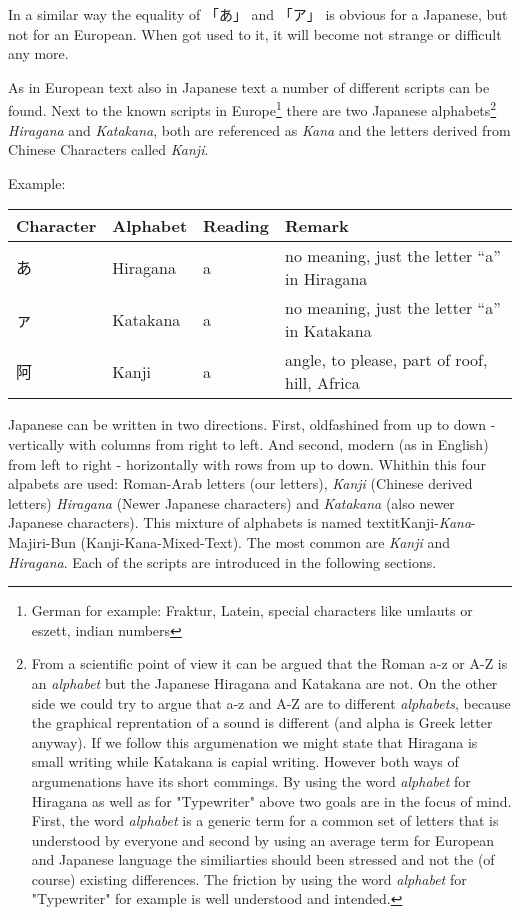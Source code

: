 In a similar way the equality of {「あ」} and {「ア」} is obvious for a
Japanese, but not for an European. When got used to it, it will become not
strange or difficult any more.

As in European text also in Japanese text a number of different scripts can be
found. Next to the known scripts in Europe\footnote{German for example:
Fraktur, Latein, special characters like umlauts or eszett, indian numbers}
there are two Japanese alphabets\footnote{ From a scientific point of view it
can be argued that the Roman a-z or A-Z is an \textit{alphabet} but the
Japanese Hiragana and Katakana are not. On the other side we could try to argue
that a-z and A-Z are to different \textit{alphabets}, because the graphical
reprentation of a sound is different (and alpha is Greek letter anyway). If we
follow this argumenation we might state that Hiragana is small writing while
Katakana is capial writing. However both ways of argumenations have its short
commings. By using the word \textit{alphabet} for Hiragana as well as for
"Typewriter" above two goals are in the focus of mind. First, the word
\textit{alphabet} is a generic term for a common set of letters that is
understood by everyone and second by using an average term for European and
Japanese language the similiarties should been stressed and not the (of course)
existing differences. The friction by using the word \textit{alphabet} for
"Typewriter" for example is well understood and intended. } \textit{Hiragana} and
\textit{Katakana}, both are referenced as \textit{Kana} and the letters derived
from Chinese Characters called \textit{Kanji}.


Example:

\begin{center}
\begin{tabular}{|l|l|l|l|}
\textbf{Character}&\textbf{Alphabet}&\textbf{Reading}&\textbf{Remark}\\\hline
あ& Hiragana & a & no meaning, just the letter  ``a'' in Hiragana \\
ァ& Katakana & a & no meaning, just the letter ``a'' in Katakana \\
阿& Kanji    & a & { angle, to please, part of roof, hill, Africa}\\
\end{tabular}
\end{center}

Japanese can be written in two directions. First, oldfashined from up to down -
vertically with columns from right to left. And second, modern (as in English)
from left to right - horizontally with rows from up to down. Whithin this four
alpabets are used: Roman-Arab letters (our letters), \textit{Kanji} (Chinese
derived letters)  \textit{Hiragana} (Newer Japanese characters) and
\textit{Katakana} (also newer Japanese characters).  This mixture of alphabets
is named textit{Kanji}-\textit{Kana}-Majiri-Bun (Kanji-Kana-Mixed-Text). The
most common are \textit{Kanji} and \textit{Hiragana}. Each of the scripts are
introduced in the following sections.

